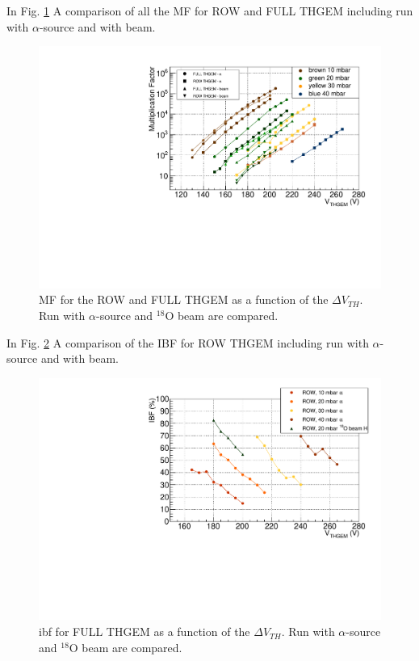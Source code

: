 \documentclass[a4paper, 11 pt]{report}
\newcommand{\Vthgem}{$\Delta V_{TH}$}
\begin{document}
  In Fig. \ref{fig:MF_ALL_beam} A comparison of all the MF for ROW and FULL THGEM including
  run with $\alpha$-source and with beam.
  \begin{figure}[htbp]
	\centering
	\includegraphics[width=\textwidth]{Immagini/MF_ALL_THGEM_withBeam.pdf}
	\caption{MF for the ROW and FULL THGEM as a function of the \Vthgem{}. Run with $\alpha$-source
	and $^{18}$O beam are compared. }
	\label{fig:MF_ALL_beam}
  \end{figure}

  In Fig. \ref{fig:IBF_ROW_THEGEM_beam} A comparison of the IBF for ROW THGEM including
  run with $\alpha$-source and with beam.
  \begin{figure}[htbp]
	\centering
	\includegraphics[width=\textwidth]{Immagini/IBF_ROW_THGEM.pdf}
	\caption{ibf for FULL THGEM as a function of the \Vthgem{}. Run with $\alpha$-source
	and $^{18}$O beam are compared. }
	\label{fig:IBF_ROW_THEGEM_beam}
  \end{figure}
\end{document}
